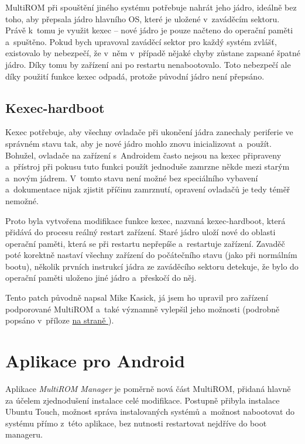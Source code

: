 \documentclass[12pt, a4paper, oneside]{article}
\newcommand{\It}{\textit}  %
\newcommand*{\attref}[1]{\hyperref[{#1}]{\uv{\nameref*{#1}} na straně \pageref{#1}}}
\begin{document}
MultiROM při spouštění jiného systému potřebuje nahrát jeho jádro, ideálně bez toho, aby přepsala jádro hlavního OS, které je uložené v~zaváděcím sektoru. Právě k~tomu je využit kexec -- nové jádro je pouze načteno do operační paměti a~spuštěno. Pokud bych upravoval zaváděcí sektor pro každý systém zvlášť, existovalo by nebezpečí, že v~něm v~případě nějaké chyby zůstane zapsané špatné jádro. Díky tomu by zařízení ani po restartu nenabootovalo. Toto nebezpečí ale díky použití funkce kexec odpadá, protože původní jádro není přepsáno.

\subsection{Kexec-hardboot}
Kexec potřebuje, aby všechny ovladače při ukončení jádra zanechaly periferie ve správném stavu tak, aby je nové jádro mohlo znovu inicializovat a~použít. Bohužel, ovladače na zařízení s~Androidem často nejsou na kexec připraveny a~přístroj při pokusu tuto funkci použít jednoduše zamrzne někde mezi starým a~novým jádrem. V~tomto stavu není možné bez speciálního vybavení a~dokumentace nijak zjistit příčinu zamrznutí, opravení ovladačů je tedy téměř nemožné.

Proto byla vytvořena modifikace funkce kexec, nazvaná kexec-hardboot, která přidává do procesu reálný restart zařízení. Staré jádro uloží nové do oblasti operační paměti, která se při restartu nepřepíše a~restartuje zařízení. Zavaděč poté korektně nastaví všechny zařízení do počátečního stavu (jako při normálním bootu), několik prvních instrukcí jádra ze zaváděcího sektoru detekuje, že bylo do operační paměti uloženo jiné jádro a~přeskočí do něj.

Tento patch původně napsal Mike Kasick\cite{kexec-hardboot-orig}, já jsem ho upravil pro zařízení podporované MultiROM a~také významně vylepšil jeho možnosti (podrobně popsáno v~příloze \attref{sec:kexec-hardboot}).

\newpage

\section{Aplikace pro Android}
Aplikace \It{MultiROM Manager} je poměrně nová část MultiROM, přidaná hlavně za účelem zjednodušení instalace celé modifikace. Postupně přibyla instalace Ubuntu Touch, možnost správa instalovaných systémů a~možnost nabootovat do systému přímo z~této aplikace, bez nutnosti restartovat nejdříve do boot manageru.
\end{document}
